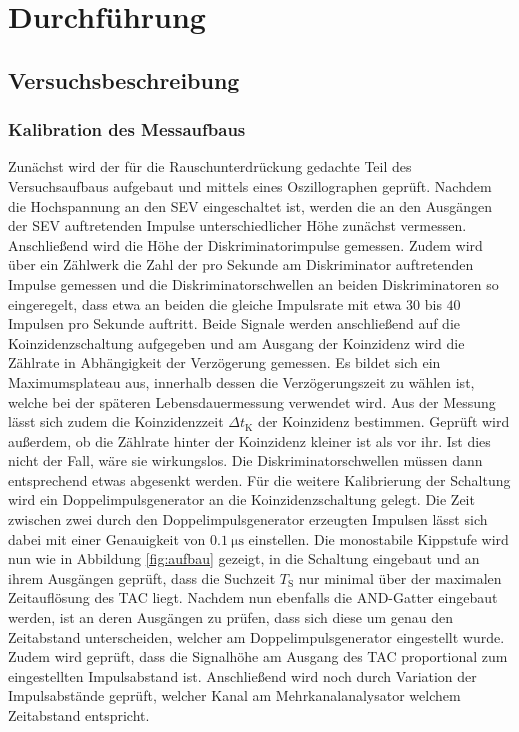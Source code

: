 \section{Durchführung}
\label{sec:Durchführung}



\subsection{Versuchsbeschreibung}
\label{sec:Versuchsbeschreibung}
\subsubsection{Kalibration des Messaufbaus}
Zunächst wird der für die Rauschunterdrückung gedachte Teil des Versuchsaufbaus aufgebaut und mittels eines Oszillographen geprüft.
Nachdem die Hochspannung an den SEV eingeschaltet ist, werden die an den Ausgängen der SEV auftretenden Impulse unterschiedlicher Höhe zunächst vermessen.
Anschließend wird die Höhe der Diskriminatorimpulse gemessen. Zudem wird über ein Zählwerk die Zahl der pro Sekunde am Diskriminator auftretenden Impulse gemessen und die Diskriminatorschwellen an beiden Diskriminatoren so eingeregelt, dass etwa an beiden die gleiche Impulsrate mit etwa $30$ bis $40$ Impulsen pro Sekunde auftritt.
Beide Signale werden anschließend auf die Koinzidenzschaltung aufgegeben und am Ausgang der Koinzidenz wird die Zählrate  in Abhängigkeit der Verzögerung gemessen. Es bildet sich ein Maximumsplateau aus, innerhalb dessen die Verzögerungszeit zu wählen ist, welche bei der späteren Lebensdauermessung verwendet wird.
Aus der Messung lässt sich zudem die Koinzidenzzeit $\Delta t_{\mathrm{K}}$ der Koinzidenz bestimmen.
Geprüft wird außerdem, ob die Zählrate hinter der Koinzidenz kleiner ist als vor ihr. Ist dies nicht der Fall, wäre sie wirkungslos. Die Diskriminatorschwellen müssen dann entsprechend etwas abgesenkt werden.
Für die weitere Kalibrierung der Schaltung wird ein Doppelimpulsgenerator an die Koinzidenzschaltung gelegt.
Die Zeit zwischen zwei durch den Doppelimpulsgenerator erzeugten Impulsen lässt sich dabei mit einer Genauigkeit von $\SI{0.1}{\micro\second}$ einstellen.
Die monostabile Kippstufe wird nun wie in Abbildung \ref{fig:aufbau} gezeigt, in die Schaltung eingebaut und an ihrem Ausgängen geprüft, dass die Suchzeit $T_{\mathrm{S}}$ nur minimal über der maximalen Zeitauflösung des TAC liegt.
Nachdem nun ebenfalls die AND-Gatter eingebaut werden, ist an deren Ausgängen zu prüfen, dass sich diese um genau den Zeitabstand unterscheiden, welcher am Doppelimpulsgenerator eingestellt wurde.
Zudem wird geprüft, dass die Signalhöhe am Ausgang des TAC proportional zum eingestellten Impulsabstand ist.
Anschließend wird noch durch Variation der Impulsabstände geprüft, welcher Kanal am Mehrkanalanalysator welchem Zeitabstand entspricht.



